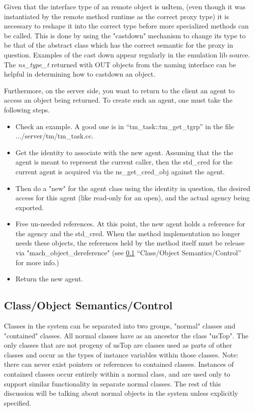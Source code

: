 Given that the interface type of an remote object is  usItem,
(even though it was instantiated by the remote method runtime as the
correct proxy type) it is necessary to reshape it into the correct
type before more specialized methods can be called.  This is done
by using the "castdown" mechanism to change its type to be that of
the abstract class which has the correct semantic for the proxy
in question.  Examples of the cast down appear regularly in the
emulation lib source.  The {\em ns\_type\_t} returned with OUT objects
from the naming interface can be helpful in determining how to castdown
an object.

Furthermore, on the server side, you want to return to the client
an agent to access an object being returned.  To create such an agent, one
must take the following steps.
\begin{itemize}
\item Check an example.  A good one is in ``tm\_task::tm\_get\_tgrp''
in the file .../server/tm/tm\_task.cc.

\item Get the identity to associate with the new agent.  Assuming that the
the agent is meant to represent the current caller, then the std\_cred
for the current agent is acquired via the ns\_get\_cred\_obj against
the agent.

\item Then do a "new" for the agent class using the identity in question,
the desired access for this agent (like read-only for an open), and the
actual agency being exported.

\item Free un-needed references.  At this point, the new agent holds a
reference for the agency and the std\_cred.  When the method implementation
no longer needs these objects, the references held by the method itself
must be release via "mach\_object\_dereference" (see {\SECREF}
\ref{sec:object-semantics} ``Class/Object Semantics/Control'' for more info.)

\item Return the new agent.
\end{itemize}

\subsection{Class/Object Semantics/Control}
\label{sec:object-semantics}
Classes in the system can be separated into two groups, "normal" classes
and "contained" classes.  All normal classes have as an ancestor the
class "usTop".  The only classes that are not progeny of usTop are classes
used as parts of other classes and occur as the types of instance variables
within those classes.  Note: there can never exist pointers or references
to contained classes.  Instances of contained classes occur entirely within
a normal class, and are used only to support similar functionality in
separate normal classes.  The rest of this discussion will be talking about
normal objects in the system unless explicitly specified.

